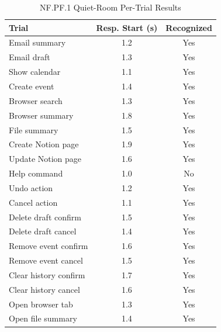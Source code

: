 \documentclass[12pt]{article}
\begin{document}
\begin{table}[htbp]
\centering
\caption{NF.PF.1 Quiet-Room Per-Trial Results}
\label{tab:pf1-quiet-room}
\begin{tabular}{>{\raggedright\arraybackslash}p{2.2cm}cc}
\toprule
\textbf{Trial} & \textbf{Resp. Start (s)} & \textbf{Recognized}\\
\midrule
Email summary & 1.2 & Yes\\
Email draft & 1.3 & Yes\\
Show calendar & 1.1 & Yes\\
Create event & 1.4 & Yes\\
Browser search & 1.3 & Yes\\
Browser summary & 1.8 & Yes\\
File summary & 1.5 & Yes\\
Create Notion page & 1.9 & Yes\\
Update Notion page & 1.6 & Yes\\
Help command & 1.0 & No\\
Undo action & 1.2 & Yes\\
Cancel action & 1.1 & Yes\\
Delete draft confirm & 1.5 & Yes\\
Delete draft cancel & 1.4 & Yes\\
Remove event confirm & 1.6 & Yes\\
Remove event cancel & 1.5 & Yes\\
Clear history confirm & 1.7 & Yes\\
Clear history cancel & 1.6 & Yes\\
Open browser tab & 1.3 & Yes\\
Open file summary & 1.4 & Yes\\
\bottomrule
\end{tabular}
\end{table}
\end{document}
